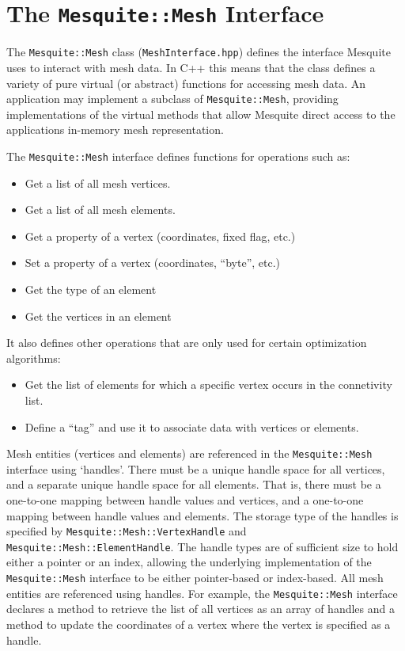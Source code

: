 \section{The \texttt{Mesquite::Mesh} Interface} \label{sec:MeshData}

The \texttt{Mesquite::Mesh} class (\texttt{MeshInterface.hpp}) defines the interface Mesquite uses to interact with mesh data.  In C++ this means that the class defines a variety of pure virtual (or abstract) functions for accessing mesh data.  An application may implement a subclass of \texttt{Mesquite::Mesh}, providing implementations of the virtual methods that allow Mesquite direct access to the applications in-memory mesh representation.  

The \texttt{Mesquite::Mesh} interface defines functions for operations such as:
\begin{itemize}
\item Get a list of all mesh vertices.
\item Get a list of all mesh elements.
\item Get a property of a vertex (coordinates, fixed flag, etc.)
\item Set a property of a vertex (coordinates, ``byte'', etc.)
\item Get the type of an element
\item Get the vertices in an element
\end{itemize}
It also defines other operations that are only used for certain optimization algorithms:
\begin{itemize}
\item Get the list of elements for which a specific vertex occurs in the connetivity list.
\item Define a ``tag'' and use it to associate data with vertices or elements.
\end{itemize}

Mesh entities (vertices and elements) are referenced in the \texttt{Mesquite::Mesh} interface using `handles'.  There must be a unique handle
space for all vertices, and a separate unique handle space for all elements. 
That is, there must be a one-to-one mapping between handle values and vertices,
and a one-to-one mapping between handle values and elements.  The storage type of
the handles is specified by \texttt{Mesquite::Mesh::VertexHandle} and
\texttt{Mesquite::Mesh::ElementHandle}.  The handle types are of sufficient size
to hold either a pointer or an index, allowing the underlying implementation of
the \texttt{Mesquite::Mesh} interface to be either pointer-based or index-based. 
All mesh entities are referenced using handles.  For example, the
\texttt{Mesquite::Mesh} interface declares a method to retrieve the list of all
vertices as an array of handles and a method to update the coordinates of a
vertex where the vertex is specified as a handle.

